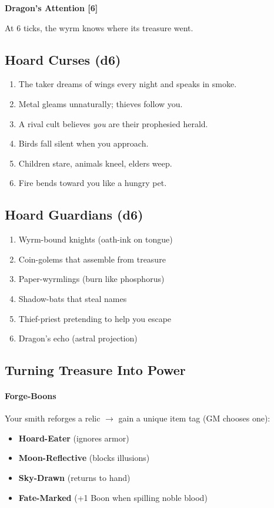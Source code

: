 \documentclass[11pt,letterpaper]{article}
\begin{document}
\begin{center}
\textbf{Dragon's Attention [6]}
\end{center}

At 6 ticks, the wyrm knows where its treasure went.

\subsection{Hoard Curses (d6)}

\begin{enumerate}[leftmargin=*]
\item The taker dreams of wings every night and speaks in smoke.
\item Metal gleams unnaturally; thieves follow you.
\item A rival cult believes \textit{you} are their prophesied herald.
\item Birds fall silent when you approach.
\item Children stare, animals kneel, elders weep.
\item Fire bends toward you like a hungry pet.
\end{enumerate}

\subsection{Hoard Guardians (d6)}

\begin{enumerate}[leftmargin=*]
\item Wyrm-bound knights (oath-ink on tongue)
\item Coin-golems that assemble from treasure
\item Paper-wyrmlings (burn like phosphorus)
\item Shadow-bats that steal names
\item Thief-priest pretending to help you escape
\item Dragon's echo (astral projection)
\end{enumerate}

\subsection{Turning Treasure Into Power}

\paragraph{Forge-Boons}
Your smith reforges a relic $\rightarrow$ gain a unique item tag (GM chooses one):
\begin{itemize}[leftmargin=*]
\item \textbf{Hoard-Eater} (ignores armor)
\item \textbf{Moon-Reflective} (blocks illusions)
\item \textbf{Sky-Drawn} (returns to hand)
\item \textbf{Fate-Marked} (+1 Boon when spilling noble blood)
\end{itemize}
\end{document}

